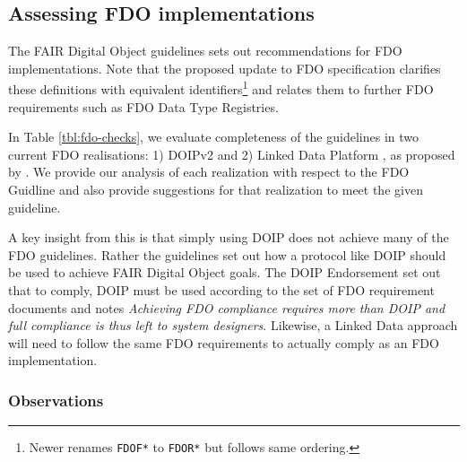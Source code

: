 \documentclass[fleqn,10pt,lineno]{wlpeerjlua}
\begin{document}


\subsection*{Assessing FDO implementations}\label{sec:doip-fdo-compare}

The FAIR Digital Object guidelines \autocite{boninoFAIRDigitalObject} sets out recommendations for FDO implementations. Note that the proposed update to FDO specification \autocite{fdo-RequirementSpec} clarifies these definitions with equivalent identifiers\footnote{Newer \autocite{fdo-RequirementSpec} renames \texttt{FDOF*} to \texttt{FDOR*} but follows same ordering.} and relates them to further FDO requirements such as FDO Data Type Registries.

In Table \vref{tbl:fdo-checks}, we evaluate completeness of the guidelines in two current FDO realisations: 1) DOIPv2 \autocite{foundationDigitalObjectInterface} and 2) Linked Data Platform \autocite{w3-ldp}, as proposed by \textcite{FDOFramework}. We provide our analysis of each realization with respect to the FDO Guidline and also provide suggestions for that realization to meet the given guideline. 

A key insight from this is that simply using DOIP does not achieve many of the FDO guidelines. Rather the guidelines set out how a protocol like DOIP should be used to achieve FAIR Digital Object goals. The DOIP Endorsement \autocite{fdo-DOIPEndorsement} set out that to comply, DOIP must be used according to the set of FDO requirement documents and notes \emph{Achieving FDO compliance requires more than DOIP and full compliance is thus left to system designers}. Likewise, a Linked Data approach will need to follow the same FDO requirements to actually comply as an FDO implementation.

\subsubsection*{Observations}
\end{document}
